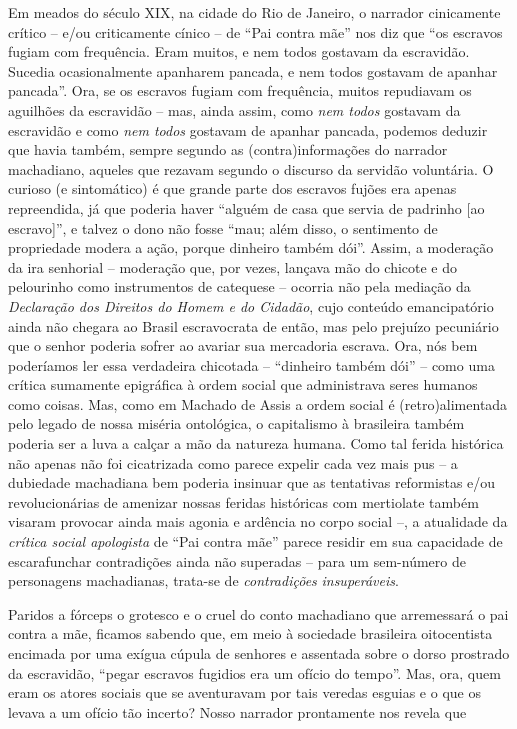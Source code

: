Em meados do século XIX, na cidade do Rio de Janeiro, o narrador
cinicamente crítico -- e/ou criticamente cínico -- de ``Pai contra mãe''
nos diz que ``os escravos fugiam com frequência. Eram muitos, e nem
todos gostavam da escravidão. Sucedia ocasionalmente apanharem pancada,
e nem todos gostavam de apanhar pancada''. Ora, se os escravos fugiam
com frequência, muitos repudiavam os aguilhões da escravidão -- mas,
ainda assim, como \emph{nem todos} gostavam da escravidão e como
\emph{nem todos} gostavam de apanhar pancada, podemos deduzir que havia
também, sempre segundo as (contra)informações do narrador machadiano,
aqueles que rezavam segundo o discurso da servidão voluntária. O curioso
(e sintomático) é que grande parte dos escravos fujões era apenas
repreendida, já que poderia haver ``alguém de casa que servia de
padrinho {[}ao escravo{]}'', e talvez o dono não fosse ``mau; além
disso, o sentimento de propriedade modera a ação, porque dinheiro também
dói''. Assim, a moderação da ira senhorial -- moderação que, por vezes,
lançava mão do chicote e do pelourinho como instrumentos de catequese --
ocorria não pela mediação da \emph{Declaração dos Direitos do Homem e do
Cidadão}, cujo conteúdo emancipatório ainda não chegara ao Brasil
escravocrata de então, mas pelo prejuízo pecuniário que o senhor poderia
sofrer ao avariar sua mercadoria escrava. Ora, nós bem poderíamos ler
essa verdadeira chicotada -- ``dinheiro também dói'' -- como uma crítica
sumamente epigráfica à ordem social que administrava seres humanos como
coisas. Mas, como em Machado de Assis a ordem social é (retro)alimentada
pelo legado de nossa miséria ontológica, o capitalismo à brasileira
também poderia ser a luva a calçar a mão da natureza humana. Como tal
ferida histórica não apenas não foi cicatrizada como parece expelir cada
vez mais pus -- a dubiedade machadiana bem poderia insinuar que as
tentativas reformistas e/ou revolucionárias de amenizar nossas feridas
históricas com mertiolate também visaram provocar ainda mais agonia e
ardência no corpo social --, a atualidade da \emph{crítica social
apologista} de ``Pai contra mãe'' parece residir em sua capacidade de
escarafunchar contradições ainda não superadas -- para um sem-número de
personagens machadianas, trata-se de \emph{contradições}
\emph{insuperáveis}.

Paridos a fórceps o grotesco e o cruel do conto machadiano que
arremessará o pai contra a mãe, ficamos sabendo que, em meio à sociedade
brasileira oitocentista encimada por uma exígua cúpula de senhores e
assentada sobre o dorso prostrado da escravidão, ``pegar escravos
fugidios era um ofício do tempo''. Mas, ora, quem eram os atores sociais
que se aventuravam por tais veredas esguias e o que os levava a um
ofício tão incerto? Nosso narrador prontamente nos revela que


